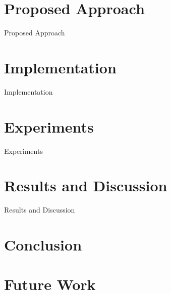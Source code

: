 \documentclass[conference]{IEEEtran}
\begin{document}
\section{Proposed Approach}

Proposed Approach

\section{Implementation}

Implementation

\section{Experiments}

Experiments

\section{Results and Discussion}

Results and Discussion

\section{Conclusion}


\section{Future Work}




\end{document}
